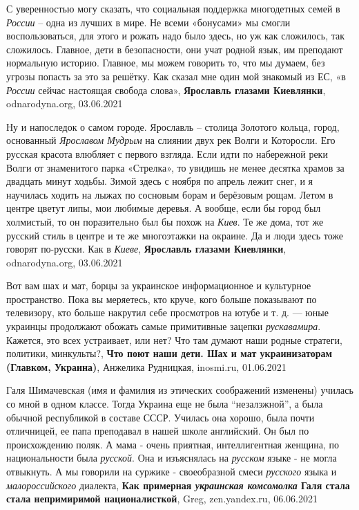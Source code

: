 С уверенностью могу сказать, что социальная поддержка многодетных семей в
\emph{России} – одна из лучших в мире. Не всеми «бонусами» мы смогли
воспользоваться, для этого и рожать надо было здесь, но уж как сложилось, так
сложилось.  Главное, дети в безопасности, они учат родной язык, им преподают
нормальную историю.  Главное, мы можем говорить то, что мы думаем, без угрозы
попасть за это за решётку. Как сказал мне один мой знакомый из ЕС, «в
\emph{России} сейчас настоящая свобода слова»,
\textbf{Ярославль глазами Киевлянки},
odnarodyna.org, 03.06.2021

Ну и напоследок о самом городе. Ярославль – столица Золотого кольца, город,
основанный \emph{Ярославом Мудрым} на слиянии двух рек Волги и Которосли. Его русская
красота влюбляет с первого взгляда. Если идти по набережной реки Волги от
знаменитого парка «Стрелка», то увидишь не менее десятка храмов за двадцать
минут ходьбы. Зимой здесь с ноября по апрель лежит снег, и я научилась ходить
на лыжах по сосновым борам и берёзовым рощам. Летом в центре цветут липы, мои
любимые деревья. А вообще, если бы город был холмистый, то он поразительно был
бы похож на \emph{Киев}. Те же дома, тот же русский стиль в центре и те же многоэтажки
на окраине. Да и люди здесь тоже говорят по-русски. Как в \emph{Киеве},
\textbf{Ярославль глазами Киевлянки},
odnarodyna.org, 03.06.2021

Вот вам шах и мат, борцы за украинское информационное и культурное
пространство.  Пока вы меряетесь, кто круче, кого больше показывают по
телевизору, кто больше накрутил себе просмотров на ютубе и т. д. — юные
украинцы продолжают обожать самые примитивные зацепки \emph{рускавамира}.  Кажется,
это всех устраивает, или нет? Что там думают наши родные стратеги, политики,
минкульты?,
\textbf{Что поют наши дети. Шах и мат украинизаторам (Главком, Украина)},
Анжелика Рудницкая, inosmi.ru, 01.06.2021

Галя Шимачевская (имя и фамилия из этических соображений изменены) училась со
мной в одном классе. Тогда Украина еще не была \enquote{незалэжной}, а была обычной
республикой в составе СССР. Училась она хорошо, была почти отличницей, ее папа
преподавал в нашей школе английский. Он был по происхождению поляк. А мама -
очень приятная, интеллигентная женщина, по национальности была \emph{русской}. Она и
изъяснялась на \emph{русском} языке - не могла отвыкнуть. А мы говорили на суржике -
своеобразной смеси \emph{русского} языка и \emph{малороссийского} диалекта,
\textbf{Как примерная \emph{украинская комсомолка} Галя стала стала непримиримой националисткой},
Greg, zen.yandex.ru, 06.06.2021

